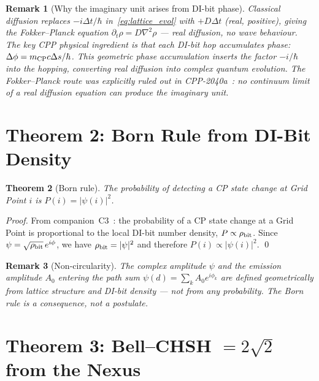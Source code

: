 \documentclass[11pt,a4paper]{article}
\newtheorem{theorem}{Theorem}[section]
\newtheorem{remark}[theorem]{Remark}
\begin{document}
\begin{remark}[Why the imaginary unit arises from DI-bit phase]
Classical diffusion replaces $-i\Delta t/\hbar$ in~\eqref{eq:lattice_evol}
with $+D\Delta t$ (real, positive), giving the Fokker--Planck equation
$\partial_t\rho = D\nabla^2\rho$ — real diffusion, no wave behaviour.
The key CPP physical ingredient is that each DI-bit hop accumulates phase:
$\Delta\phi = m_{\rm CP}c\Delta s/\hbar$. This geometric phase
accumulation inserts the factor $-i/\hbar$ into the hopping, converting
real diffusion into complex quantum evolution. The Fokker--Planck route
was explicitly ruled out in CPP-2040a~\citep{cpp2040a}: no continuum
limit of a real diffusion equation can produce the imaginary unit.
\end{remark}

\section{Theorem 2: Born Rule from DI-Bit Density}

\begin{theorem}[Born rule]
\label{thm:born}
The probability of detecting a CP state change at Grid Point $i$ is
$P(i) = |\psi(i)|^2$.
\end{theorem}

\begin{proof}
From companion~C3~\citep{abshier2026c3}: the probability of a CP state
change at a Grid Point is proportional to the local DI-bit number
density, $P \propto \rho_{\rm bit}$.
Since $\psi = \sqrt{\rho_{\rm bit}}\,e^{i\phi}$, we have
$\rho_{\rm bit} = |\psi|^2$ and therefore $P(i) \propto |\psi(i)|^2$. \qed
\end{proof}

\begin{remark}[Non-circularity]
The complex amplitude $\psi$ and the emission amplitude $A_0$ entering
the path sum $\psi(d) = \sum_k A_0 e^{i\phi_k}$ are defined geometrically
from lattice structure and DI-bit density — not from any probability.
The Born rule is a consequence, not a postulate.
\end{remark}

\section{Theorem 3: Bell--CHSH $= 2\sqrt{2}$ from the Nexus}
\end{document}

